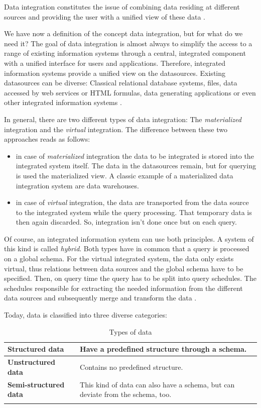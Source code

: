 Data integration constitutes the issue of combining data residing at different sources and providing the user with a unified view of these data \cite{Lenzerini:2002:DIT:543613.543644}. 

We have now a definition of the concept data integration, but for what do we need it? The goal of data integration is almost always to simplify the access to a range of existing information systems through a central, integrated component with a unified interface for users and applications. Therefore, integrated information systems provide a unified view on the datasources. Existing datasources can be diverse: Classical relational database systems, files, data accessed by web services or HTML formulas, data generating applications or even other integrated information systems \cite[p. 3-4]{DBLP:books/dp/LeserN2006}.

In general, there are two different types of data integration: The \emph{materialized} integration and the \emph{virtual} integration. The difference between these two approaches reads as follows:

\begin{itemize}
 \item \label{materialized_index}in case of \emph{materialized} integration the data to be integrated is stored  into the integrated system itself. The data in the datasources remain, but for querying is used the materialized view. A classic example of a materialized data integration system are data warehouses.
 \item \label{virtual_index}in case of \emph{virtual} integration, the data are transported from the data source to the integrated system while the query processing. That temporary data is then again discarded. So, integration isn't done once but on each query.
\end{itemize}

Of course, an integrated information system can use both principles. A system of this kind is called \emph{hybrid}\label{hybrid_index}. Both types have in common that a query is processed on a global schema. For the virtual integrated system, the data only exists virtual, thus relations between data sources and the global schema have to be specified. Then, on query time the query has to be split into query schedules. The schedules responsible for extracting the needed information from the different data sources and subsequently merge and transform the data \cite[p. 86-88]{DBLP:books/dp/LeserN2006}.

Today, data is classified into three diverse categories:
\begin{longtable}{|l|p{}|}
\hline
 \textbf{Structured data}  &  Have a predefined structure through a schema.\\ \hline
 \textbf{Unstructured data}    &  Contains no predefined structure.\\ \hline
 \textbf{Semi-structured data} & This kind of data can also have a schema, but can deviate from the schema, too.\\ \hline
\caption{Types of data \cite[p. 17]{DBLP:books/dp/LeserN2006}}
\label{type_of_data_label}
\end{longtable}

